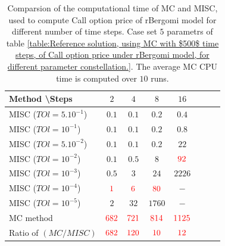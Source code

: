 \documentclass[11pt]{article}
\begin{document}
\begin{table}[h!]
	\centering
	\begin{tabular}{l*{6}{c}r}
		Method \textbackslash  Steps            & $2$ & $4$ & $8$ & $16$ &   \\
		\hline
		MISC ($TOl=5.10^{-1}$)  & $0.1$ & $0.1$ & $0.2$ & $0.4$  \\
		MISC ($TOl=10^{-1}$)  & $0.1$ & $0.1$ & $0.2$ & $0.8$ \\
		MISC ($TOl=5.10^{-2}$)  & $0.1$ & $0.1$ & $0.2$ & $22$  \\
		MISC ($TOl=10^{-2}$)  & $0.1$ & $0.5$ & $8$ & $\red{92}$ \\
		MISC ($TOl=10^{-3}$)  & $0.5$ & $3$ & $24$ & $2226$ \\
		MISC ($TOl=10^{-4}$)  & $\red{1}$ & $\red{6}$ & $\red{80}$ & $-$\\
		MISC ($TOl=10^{-5}$)  & $2$ & $32$ & $1760$ & $-$
		 \\
		\hline
		MC method   & $ \red{682}
		
		$  & $  \red{721}$  & $  \red{814}$ & $ \red{1125}
		$  \\	
		\hline
		Ratio of $\left(MC/MISC \right)$ & $ \red{682}
		
		$  & $  \red{ 120}$  & $  \red{  10
		}$ & $ \red{ 12}
		$  \\	
		
		\hline
	\end{tabular}
	\caption{Comparsion of the computational time of  MC and MISC, used to compute Call option price of rBergomi model for different number of time steps. Case set $5$ parametrs of table \ref{table:Reference solution, using MC with $500$ time steps, of Call option price under rBergomi model, for different parameter constellation.}. The average  MC CPU time is computed over $10$ runs. }
	\label{Comparsion of the computational time of  MC and MISC, used to compute Call option price of rBergomi model for different number of time steps. Case set5}
\end{table}
\end{document}
